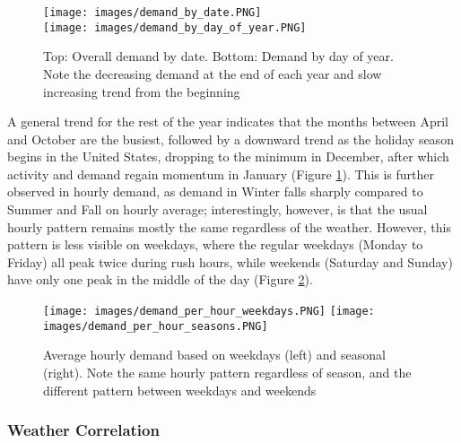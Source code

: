 \documentclass{article}
\begin{document}
\begin{figure}
    
    \texttt{[image: images/demand\_by\_date.PNG]}
    \\
    \texttt{[image: images/demand\_by\_day\_of\_year.PNG]}
    \caption{Top: Overall demand by date. Bottom: Demand by day of year. Note the decreasing demand at the end of each year and slow increasing trend from the beginning}\label{fig:foobar}
\label{fig:demand_by_dates}
\end{figure}

A general trend for the rest of the year indicates that the months between April and October are the busiest, followed by a downward trend as the holiday season begins in the United States, dropping to the minimum in December, after which activity and demand regain momentum in January (Figure \ref{fig:demand_by_dates}). This is further observed in hourly demand, as demand in Winter falls sharply compared to Summer and Fall on hourly average; interestingly, however, is that the usual hourly pattern remains mostly the same regardless of the weather. However, this pattern is less visible on weekdays, where the regular weekdays (Monday to Friday) all peak twice during rush hours, while weekends (Saturday and Sunday) have only one peak in the middle of the day (Figure \ref{fig:demand_hourly}).




\begin{figure}
    
    \texttt{[image: images/demand\_per\_hour\_weekdays.PNG]}
    \texttt{[image: images/demand\_per\_hour\_seasons.PNG]}
    \caption{Average hourly demand based on weekdays (left) and seasonal (right). Note the same hourly pattern regardless of season, and the different pattern between weekdays and weekends}\label{fig:foobar}
\label{fig:demand_hourly}
\end{figure}

\subsubsection{Weather Correlation}
\end{document}
